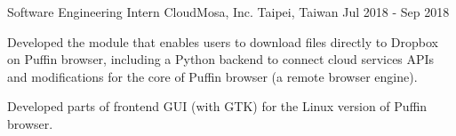 \begin{cventries}


  \cventry
    {Software Engineering Intern} %
    {CloudMosa, Inc.} %
    {Taipei, Taiwan} %
    {Jul 2018 - Sep 2018} %
    {
      \begin{cvitems} %
        \item {Developed the module that enables users to download files directly to Dropbox on Puffin browser,
        including a Python backend to connect cloud services APIs and modifications for the core of Puffin browser (a remote browser engine).}
        \item {Developed parts of frontend GUI (with GTK) for the Linux version of Puffin browser.}
      \end{cvitems}
    }

    \vspace{-2mm}






\end{cventries}
